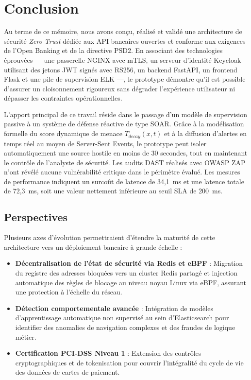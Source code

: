 \clearpage
\section{Conclusion}

Au terme de ce mémoire, nous avons conçu, réalisé et validé une architecture de sécurité \textit{Zero Trust} dédiée aux API bancaires ouvertes et conforme aux exigences de l'Open Banking et de la directive PSD2. En associant des technologies éprouvées --- une passerelle NGINX avec mTLS, un serveur d'identité Keycloak utilisant des jetons JWT signés avec RS256, un backend FastAPI, un frontend Flask et une pile de supervision ELK ---, le prototype démontre qu'il est possible d'assurer un cloisonnement rigoureux sans dégrader l'expérience utilisateur ni dépasser les contraintes opérationnelles.

L'apport principal de ce travail réside dans le passage d'un modèle de supervision passive à un système de défense réactive de type SOAR. Grâce à la modélisation formelle du score dynamique de menace $T_{decay}(x, t)$ et à la diffusion d'alertes en temps réel au moyen de Server-Sent Events, le prototype peut isoler automatiquement une source hostile en moins de 30 secondes, tout en maintenant le contrôle de l'analyste de sécurité. Les audits DAST réalisés avec OWASP ZAP n'ont révélé aucune vulnérabilité critique dans le périmètre évalué. Les mesures de performance indiquent un surcoût de latence de 34,1~ms et une latence totale de 72,3~ms, soit une valeur nettement inférieure au seuil SLA de 200~ms.

\subsection*{Perspectives}
Plusieurs axes d'évolution permettraient d'étendre la maturité de cette architecture vers un déploiement bancaire à grande échelle :
\begin{itemize}[leftmargin=*]
    \item \textbf{Décentralisation de l'état de sécurité via Redis et eBPF} : Migration du registre des adresses bloquées vers un cluster Redis partagé et injection automatique des règles de blocage au niveau noyau Linux via eBPF, assurant une protection à l'échelle du réseau.
    \item \textbf{Détection comportementale avancée} : Intégration de modèles d'apprentissage automatique non supervisé au sein d'Elasticsearch pour identifier des anomalies de navigation complexes et des fraudes de logique métier.
    \item \textbf{Certification PCI-DSS Niveau 1} : Extension des contrôles cryptographiques et de tokenisation pour couvrir l'intégralité du cycle de vie des données de cartes de paiement.
\end{itemize}

